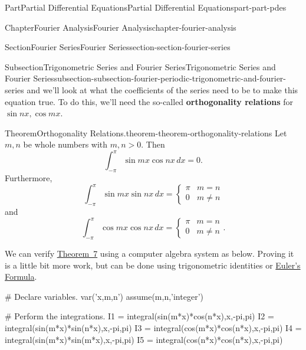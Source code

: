\documentclass[twoside,10pt,]{book}
\newcommand{\terminology}[1]{\textbf{#1}}
\numberwithin{equation}{part}
\newcommand{\amp}{&}
\begin{document}
\begin{partptx}{Part}{Partial Differential Equations}{}{Partial Differential Equations}{}{}{part-part-pdes}
\begin{chapterptx}{Chapter}{Fourier Analysis}{}{Fourier Analysis}{}{}{chapter-fourier-analysis}
\begin{sectionptx}{Section}{Fourier Series}{}{Fourier Series}{}{}{section-section-fourier-series}
\begin{subsectionptx}{Subsection}{Trigonometric Series and Fourier Series}{}{Trigonometric Series and Fourier Series}{}{}{subsection-subsection-fourier-periodic-trigonometric-and-fourier-series}
and we'll look at what the coefficients of the series need to be to make this equation true. To do this, we'll need the so-called \terminology{orthogonality relations} for \(\sin nx,\cos mx\).%
\begin{theorem}{Theorem}{Orthogonality Relations.}{}{theorem-theorem-orthogonality-relations}%
%
Let \(m,n\) be whole numbers with \(m,n>0\). Then%
\begin{equation*}
\int_{-\pi}^{\pi}\sin mx\cos nx\,dx = 0\text{.}
\end{equation*}
Furthermore,%
\begin{equation*}
\int_{-\pi}^{\pi}\sin mx\sin nx\,dx = \begin{cases} \pi \amp m=n \\ 0 \amp m\neq n\end{cases}
\end{equation*}
and%
\begin{equation*}
\int_{-\pi}^{\pi}\cos mx\cos nx\,dx = \begin{cases} \pi \amp m=n \\ 0 \amp m\neq n\end{cases}\text{.}
\end{equation*}
%
\end{theorem}
We can verify \hyperref[theorem-theorem-orthogonality-relations]{Theorem~7} using a computer algebra system as below. Proving it is a little bit more work, but can be done using trigonometric identities or \hyperref[theorem-theorem-euler-s-formula]{Euler's Formula}.%
\begin{sageinput}
# Declare variables.
var('x,m,n')
assume(m,n,'integer')

# Perform the integrations.
I1 = integral(sin(m*x)*cos(n*x),x,-pi,pi)
I2 = integral(sin(m*x)*sin(n*x),x,-pi,pi)
I3 = integral(cos(m*x)*cos(n*x),x,-pi,pi)
I4 = integral(sin(m*x)*sin(m*x),x,-pi,pi)
I5 = integral(cos(n*x)*cos(n*x),x,-pi,pi)


\end{sageinput}
\end{subsectionptx}
\end{sectionptx}
\end{chapterptx}
\end{partptx}
\end{document}
